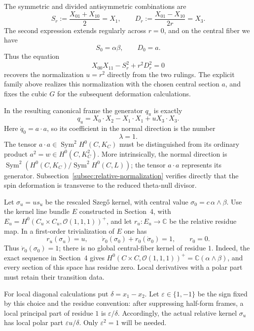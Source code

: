 \documentclass[10pt,a4paper]{amsart}
\newcommand{\OO}{\mathcal O}
\begin{document}
The symmetric and divided antisymmetric combinations are
\[
S_r:=\frac{X_{01}+X_{10}}{2}=X_1,
\qquad
D_r:=\frac{X_{01}-X_{10}}{2r}=X_3.
\]
The second expression extends regularly across $r=0$, and on
the central fiber we have
\[
S_0=\alpha\beta,\qquad D_0=a.
\]
Thus the equation
\[
X_{00}X_{11}-S_r^2+r^2D_r^2=0
\]
recovers the normalization $u=r^2$ directly from the two rulings.
The explicit family above realizes this normalization with the
chosen central section $a$, and fixes the cubic $G$ for the
subsequent deformation calculations.
\endgroup

In the resulting canonical frame the generator $q_u$ is exactly
\begin{equation}
\label{eq:quadric-normalized-smoothing}
q_u=X_0\cdot X_2-X_1\cdot X_1+uX_3\cdot X_3.
\end{equation}
Here $\dot q_0=a\cdot a$, so its coefficient in the normal direction is
the number
\begin{equation}
\label{eq:lambda-one}
\lambda=1.
\end{equation}
The tensor $a\cdot a\in\operatorname{Sym}^2H^0(C,K_C)$ must be
distinguished from its ordinary product $a^2=w\in H^0(C,K_C^2)$.
More intrinsically, the normal direction is
$\operatorname{Sym}^2(H^0(C,K_C)/\operatorname{Sym}^2H^0(C,L))$;
the tensor $a\cdot a$ represents its generator.
Subsection~\ref{subsec:relative-normalization} verifies directly that
the spin deformation is transverse to the reduced theta-null divisor.

Let $\sigma_u=us_u$ be the rescaled Szeg\H{o} kernel, with central
value $\sigma_0=c\,\alpha\wedge\beta$. Use the kernel line bundle $E$ constructed in Section~4, with
$E_u=H^0(C_u\times C_u,\OO(1,1,1))^+$, and let
$r_u:E_u\to\mathbb C$ be the relative residue map.
In a first-order trivialization of $E$ one has
\begin{equation}
\label{eq:first-residue-jet}
r_u(\sigma_u)=u,\qquad
\dot r_0(\sigma_0)+r_0(\dot\sigma_0)=1,
\qquad r_0=0.
\end{equation}
Thus $\dot r_0(\sigma_0)=1$; there is no global central-fiber kernel
of residue $1$. Indeed, the exact sequence in Section~4 gives
$H^0(C\times C,\OO(1,1,1))^+=\mathbb C(\alpha\wedge\beta)$, and
every section of this space has residue zero. Local derivatives with
a polar part must retain their transition data.

For local diagonal calculations put $\delta=x_1-x_2$. Let
$\varepsilon\in\{1,-1\}$ be the sign fixed by this choice and the
residue convention: after suppressing half-form frames, a local
principal part of residue $1$ is $\varepsilon/\delta$.
Accordingly, the actual relative kernel $\sigma_u$ has local polar
part $\varepsilon u/\delta$. Only $\varepsilon^2=1$ will be needed.
\endgroup
\end{document}

